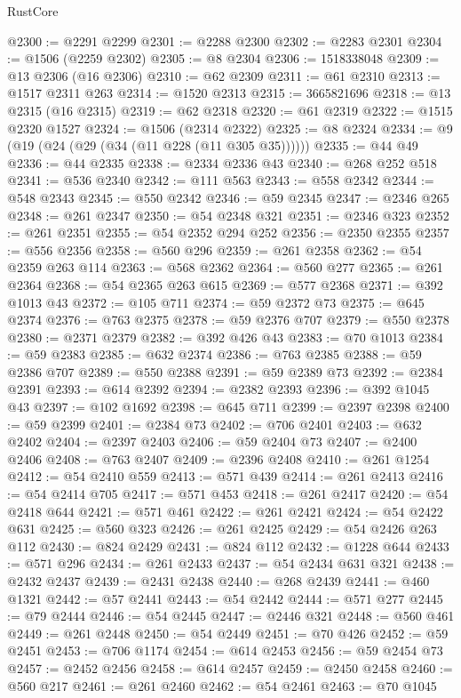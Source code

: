 \begin{lexlean}{RustCore}
\begin{coremodule}
@2300 := @2291 @2299
@2301 := @2288 @2300
@2302 := @2283 @2301
@2304 := @1506 (@2259 @2302)
@2305 := @8 @2304
@2306 := 1518338048
@2309 := @13 @2306 (@16 @2306)
@2310 := @62 @2309
@2311 := @61 @2310
@2313 := @1517 @2311 @263
@2314 := @1520 @2313
@2315 := 3665821696
@2318 := @13 @2315 (@16 @2315)
@2319 := @62 @2318
@2320 := @61 @2319
@2322 := @1515 @2320 @1527
@2324 := @1506 (@2314 @2322)
@2325 := @8 @2324
@2334 := @9 (@19 (@24 (@29 (@34 (@11 @228 (@11 @305 @35))))))
@2335 := @44 @49
@2336 := @44 @2335
@2338 := @2334 @2336 @43
@2340 := @268 @252 @518
@2341 := @536 @2340
@2342 := @111 @563
@2343 := @558 @2342
@2344 := @548 @2343
@2345 := @550 @2342
@2346 := @59 @2345
@2347 := @2346 @265
@2348 := @261 @2347
@2350 := @54 @2348 @321
@2351 := @2346 @323
@2352 := @261 @2351
@2355 := @54 @2352 @294 @252
@2356 := @2350 @2355
@2357 := @556 @2356
@2358 := @560 @296
@2359 := @261 @2358
@2362 := @54 @2359 @263 @114
@2363 := @568 @2362
@2364 := @560 @277
@2365 := @261 @2364
@2368 := @54 @2365 @263 @615
@2369 := @577 @2368
@2371 := @392 @1013 @43
@2372 := @105 @711
@2374 := @59 @2372 @73
@2375 := @645 @2374
@2376 := @763 @2375
@2378 := @59 @2376 @707
@2379 := @550 @2378
@2380 := @2371 @2379
@2382 := @392 @426 @43
@2383 := @70 @1013
@2384 := @59 @2383
@2385 := @632 @2374
@2386 := @763 @2385
@2388 := @59 @2386 @707
@2389 := @550 @2388
@2391 := @59 @2389 @73
@2392 := @2384 @2391
@2393 := @614 @2392
@2394 := @2382 @2393
@2396 := @392 @1045 @43
@2397 := @102 @1692
@2398 := @645 @711
@2399 := @2397 @2398
@2400 := @59 @2399
@2401 := @2384 @73
@2402 := @706 @2401
@2403 := @632 @2402
@2404 := @2397 @2403
@2406 := @59 @2404 @73
@2407 := @2400 @2406
@2408 := @763 @2407
@2409 := @2396 @2408
@2410 := @261 @1254
@2412 := @54 @2410 @559
@2413 := @571 @439
@2414 := @261 @2413
@2416 := @54 @2414 @705
@2417 := @571 @453
@2418 := @261 @2417
@2420 := @54 @2418 @644
@2421 := @571 @461
@2422 := @261 @2421
@2424 := @54 @2422 @631
@2425 := @560 @323
@2426 := @261 @2425
@2429 := @54 @2426 @263 @112
@2430 := @824 @2429
@2431 := @824 @112
@2432 := @1228 @644
@2433 := @571 @296
@2434 := @261 @2433
@2437 := @54 @2434 @631 @321
@2438 := @2432 @2437
@2439 := @2431 @2438
@2440 := @268 @2439
@2441 := @460 @1321
@2442 := @57 @2441
@2443 := @54 @2442
@2444 := @571 @277
@2445 := @79 @2444
@2446 := @54 @2445
@2447 := @2446 @321
@2448 := @560 @461
@2449 := @261 @2448
@2450 := @54 @2449
@2451 := @70 @426
@2452 := @59 @2451
@2453 := @706 @1174
@2454 := @614 @2453
@2456 := @59 @2454 @73
@2457 := @2452 @2456
@2458 := @614 @2457
@2459 := @2450 @2458
@2460 := @560 @217
@2461 := @261 @2460
@2462 := @54 @2461
@2463 := @70 @1045

\end{coremodule}
\end{lexlean}
